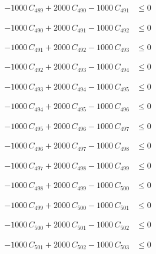 \documentclass[a4paper,11pt]{article}
\begin{document}
\begin{align}
-1000\,C_{489} + 2000\,C_{490} - 1000\,C_{491} &\leq 0 \nonumber
\end{align}

\begin{align}
-1000\,C_{490} + 2000\,C_{491} - 1000\,C_{492} &\leq 0 \nonumber
\end{align}

\begin{align}
-1000\,C_{491} + 2000\,C_{492} - 1000\,C_{493} &\leq 0 \nonumber
\end{align}

\begin{align}
-1000\,C_{492} + 2000\,C_{493} - 1000\,C_{494} &\leq 0 \nonumber
\end{align}

\begin{align}
-1000\,C_{493} + 2000\,C_{494} - 1000\,C_{495} &\leq 0 \nonumber
\end{align}

\begin{align}
-1000\,C_{494} + 2000\,C_{495} - 1000\,C_{496} &\leq 0 \nonumber
\end{align}

\begin{align}
-1000\,C_{495} + 2000\,C_{496} - 1000\,C_{497} &\leq 0 \nonumber
\end{align}

\begin{align}
-1000\,C_{496} + 2000\,C_{497} - 1000\,C_{498} &\leq 0 \nonumber
\end{align}

\begin{align}
-1000\,C_{497} + 2000\,C_{498} - 1000\,C_{499} &\leq 0 \nonumber
\end{align}

\begin{align}
-1000\,C_{498} + 2000\,C_{499} - 1000\,C_{500} &\leq 0 \nonumber
\end{align}

\begin{align}
-1000\,C_{499} + 2000\,C_{500} - 1000\,C_{501} &\leq 0 \nonumber
\end{align}

\begin{align}
-1000\,C_{500} + 2000\,C_{501} - 1000\,C_{502} &\leq 0 \nonumber
\end{align}

\begin{align}
-1000\,C_{501} + 2000\,C_{502} - 1000\,C_{503} &\leq 0 \nonumber
\end{align}
\end{document}
